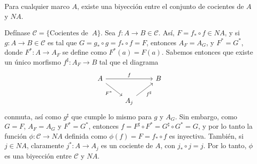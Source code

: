 \begin{exe}%
Para cualquier marco $A$, existe una biyección entre el conjunto de cocientes de $A$ y $NA$.
\end{exe}
\begin{sol}
    Defínase $\mathcal{C}=\{\text{Cocientes de } \ A\}$. Sea $f:A\to B\in \mathcal{C}$. Así, $F=f_*\circ f\in NA$, y si $g:A\to B\in\mathcal{C}$ es tal que $G=g_*\circ g=f_*\circ f=F$, entonces $A_F=A_G$, y $F^*=G^*$, donde $F^*:A\to A_F$ se define como $F^*(a)=F(a)$. Sabemos entonces que existe un único morfismo $f^\sharp:A_F\to B$ tal que el diagrama
    \[
        \begin{tikzcd}
            A \ar[rr,"f"] \ar[dr,"F^*"'] &&  B \\
            &A_j \ar[ur,"f^\sharp"']
        \end{tikzcd}
    \]
    conmuta, así como $g^\sharp$ que cumple lo mismo para $g$ y $A_G$. Sin embargo, como $G=F$, $A_F=A_G$ y $F^*=G^*$, entonces $f=F^\sharp\circ F^*=G^\sharp\circ G^*=G$, y por lo tanto la función $\phi:\mathcal{C}\to NA$ definida como $\phi(f)=F=f_*\circ f$ es inyectiva. También, si $j\in NA$, claramente $j^*:A\to A_j$ es un cociente de $A$, con $j_*\circ j =j$. Por lo tanto, $\phi$ es una biyección entre $\mathcal{C}$ y $NA$.
\end{sol}

